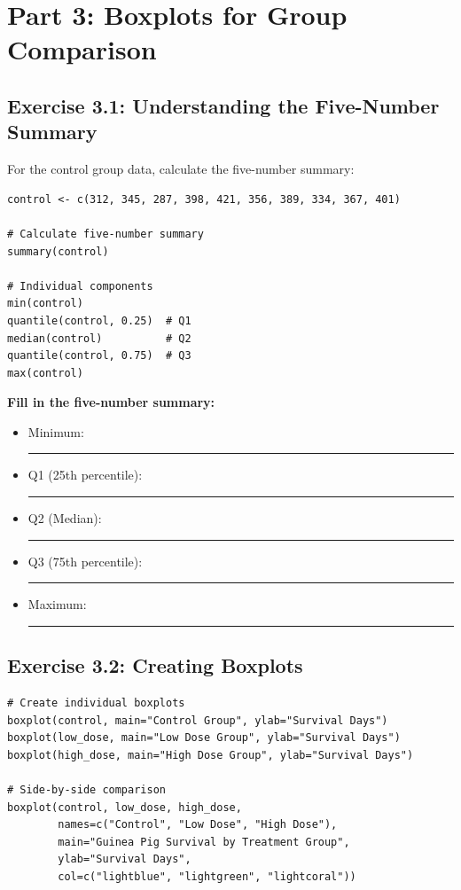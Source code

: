 \documentclass[11pt]{article}
\begin{document}
\section{Part 3: Boxplots for Group Comparison}

\subsection{Exercise 3.1: Understanding the Five-Number Summary}

For the control group data, calculate the five-number summary:

\begin{lstlisting}
control <- c(312, 345, 287, 398, 421, 356, 389, 334, 367, 401)

# Calculate five-number summary
summary(control)

# Individual components
min(control)
quantile(control, 0.25)  # Q1
median(control)          # Q2
quantile(control, 0.75)  # Q3
max(control)
\end{lstlisting}

\textbf{Fill in the five-number summary:}
\begin{itemize}
\item Minimum: \rule{2cm}{0.4pt}
\item Q1 (25th percentile): \rule{2cm}{0.4pt}
\item Q2 (Median): \rule{2cm}{0.4pt}
\item Q3 (75th percentile): \rule{2cm}{0.4pt}
\item Maximum: \rule{2cm}{0.4pt}
\end{itemize}

\subsection{Exercise 3.2: Creating Boxplots}

\begin{lstlisting}
# Create individual boxplots
boxplot(control, main="Control Group", ylab="Survival Days")
boxplot(low_dose, main="Low Dose Group", ylab="Survival Days")
boxplot(high_dose, main="High Dose Group", ylab="Survival Days")

# Side-by-side comparison
boxplot(control, low_dose, high_dose,
        names=c("Control", "Low Dose", "High Dose"),
        main="Guinea Pig Survival by Treatment Group",
        ylab="Survival Days",
        col=c("lightblue", "lightgreen", "lightcoral"))
\end{lstlisting}
\end{document}
